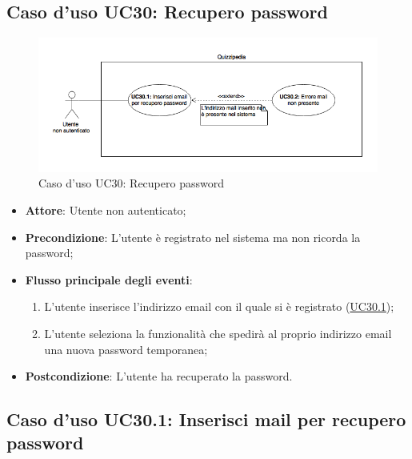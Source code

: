 \documentclass[12pt,a4paper]{article}
\begin{document}
\subsection{Caso d'uso UC30: Recupero password}
\begin{figure}[H]
	\centering
	\includegraphics[width=\textwidth]{../img/diagramUC30.png}
	\caption{Caso d'uso UC30: Recupero password}\label{fig:UC30} 
\end{figure}
\begin{itemize}

\item \textbf{Attore}: Utente non autenticato; 
\item \textbf{Precondizione}: L'utente è registrato nel sistema ma non ricorda la password;

\item \textbf{Flusso principale degli eventi}:
\begin{enumerate}
	\item L'utente inserisce l'indirizzo email con il quale si è registrato (\hyperlink{UC30.1}{UC30.1});
	\item L'utente seleziona la funzionalità che spedirà al proprio indirizzo email una nuova password temporanea;
	
\end{enumerate}
\item \textbf{Postcondizione}: L'utente ha recuperato la password.
\end{itemize}
\hypertarget{UC30.1}{}
\subsection{Caso d'uso UC30.1: Inserisci mail per recupero password}
\end{document}
